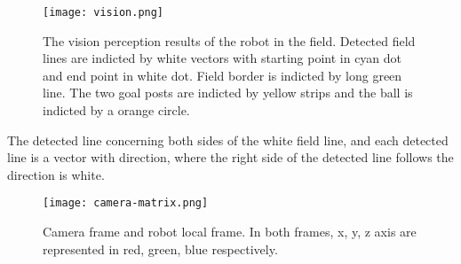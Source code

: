 \begin{figure}[h!]
  \centering
  \texttt{[image: vision.png]}
  \caption[The vision perception result of the robot in the field.]{The vision perception results of the robot in the field. Detected field lines are indicted by white vectors with starting point in cyan dot and end point in white dot. Field border is indicted by long green line. The two goal posts are indicted by yellow strips and the ball is indicted by a orange circle.}
  \label{fig:perception}
\end{figure}

The detected line concerning both sides of the white field line, and each detected line is a vector with direction, where the right side of the detected line follows the direction is white.


\begin{figure}[h!]
  \centering
  \texttt{[image: camera-matrix.png]}
  \caption{Camera frame and robot local frame. In both frames, x, y, z axis are represented in red, green, blue respectively.}
  \label{fig:cameramatrix}
\end{figure}

